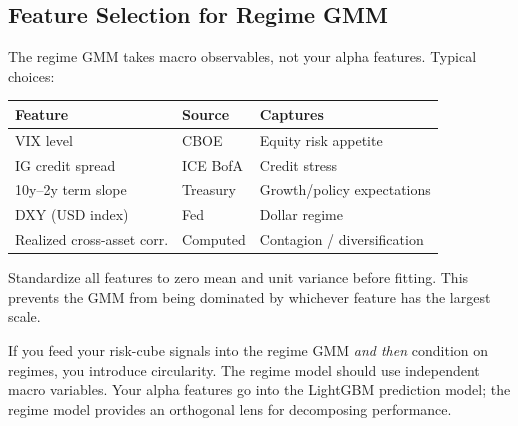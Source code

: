 \subsection{Feature Selection for Regime GMM}
\label{sec:regimes:features}

The regime GMM takes macro observables, not your alpha features.  Typical
choices:

\begin{center}
\begin{tabular}{lll}
  \toprule
  Feature & Source & Captures \\
  \midrule
  VIX level & CBOE & Equity risk appetite \\
  IG credit spread & ICE BofA & Credit stress \\
  10y--2y term slope & Treasury & Growth/policy expectations \\
  DXY (USD index) & Fed & Dollar regime \\
  Realized cross-asset corr. & Computed & Contagion / diversification \\
  \bottomrule
\end{tabular}
\end{center}

Standardize all features to zero mean and unit variance before fitting.
This prevents the GMM from being dominated by whichever feature has the
largest scale.

\begin{warning}
If you feed your risk-cube signals into the regime GMM \emph{and then}
condition on regimes, you introduce circularity.  The regime model should
use independent macro variables.  Your alpha features go into the
LightGBM prediction model; the regime model provides an orthogonal lens
for decomposing performance.
\end{warning}

